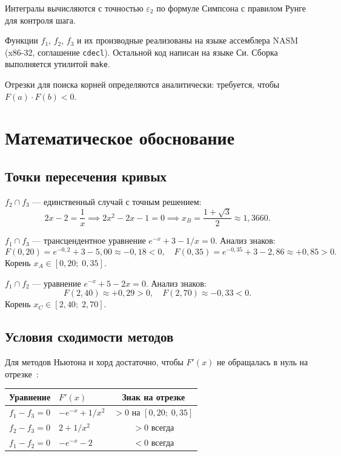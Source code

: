 \documentclass[a4paper,12pt,titlepage,finall]{article}
\begin{document}
Интегралы вычисляются с точностью $\varepsilon_2$ по формуле Симпсона
с правилом Рунге для контроля шага.

Функции $f_1$, $f_2$, $f_3$ и их производные реализованы на языке
ассемблера NASM (x86-32, соглашение \texttt{cdecl}).
Остальной код написан на языке Си. Сборка выполняется утилитой \texttt{make}.

Отрезки для поиска корней определяются аналитически: требуется, чтобы
$F(a) \cdot F(b) < 0$.

\newpage

\section{Математическое обоснование}

\subsection{Точки пересечения кривых}

\textbf{$f_2 \cap f_3$} --- единственный случай с точным решением:
\[
    2x - 2 = \frac{1}{x} \implies 2x^2 - 2x - 1 = 0
    \implies x_B = \frac{1 + \sqrt{3}}{2} \approx 1{,}3660.
\]

\textbf{$f_1 \cap f_3$} --- трансцендентное уравнение $e^{-x} + 3 - 1/x = 0$.
Анализ знаков:
\[
    F(0{,}20) = e^{-0{,}2} + 3 - 5{,}00 \approx -0{,}18 < 0, \quad
    F(0{,}35) = e^{-0{,}35} + 3 - 2{,}86 \approx +0{,}85 > 0.
\]
Корень $x_A \in [0{,}20;\; 0{,}35]$.

\textbf{$f_1 \cap f_2$} --- уравнение $e^{-x} + 5 - 2x = 0$.
Анализ знаков:
\[
    F(2{,}40) \approx +0{,}29 > 0, \quad F(2{,}70) \approx -0{,}33 < 0.
\]
Корень $x_C \in [2{,}40;\; 2{,}70]$.

\subsection{Условия сходимости методов}

Для методов Ньютона и хорд достаточно, чтобы $F'(x)$ не обращалась в нуль на отрезке~\cite{math}:

\begin{center}
\begin{tabular}{|l|l|c|}
\hline
Уравнение & $F'(x)$ & Знак на отрезке \\
\hline
$f_1 - f_3 = 0$ & $-e^{-x} + 1/x^2$ & $> 0$ на $[0{,}20;\;0{,}35]$ \\
$f_2 - f_3 = 0$ & $2 + 1/x^2$       & $> 0$ всегда \\
$f_1 - f_2 = 0$ & $-e^{-x} - 2$     & $< 0$ всегда \\
\hline
\end{tabular}
\end{center}
\end{document}
